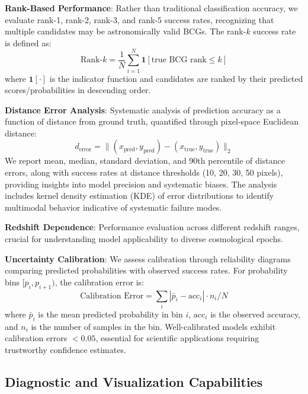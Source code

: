 \documentclass[twocolumn,10pt]{aastex631}
\begin{document}
\textbf{Rank-Based Performance}: Rather than traditional classification accuracy, we evaluate rank-1, rank-2, rank-3, and rank-5 success rates, recognizing that multiple candidates may be astronomically valid BCGs. The rank-$k$ success rate is defined as:
\begin{equation}
\text{Rank-}k = \frac{1}{N} \sum_{i=1}^{N} \mathbf{1}[\text{true BCG rank} \leq k]
\end{equation}
where $\mathbf{1}[\cdot]$ is the indicator function and candidates are ranked by their predicted scores/probabilities in descending order.

\textbf{Distance Error Analysis}: Systematic analysis of prediction accuracy as a function of distance from ground truth, quantified through pixel-space Euclidean distance:
\begin{equation}
d_{\text{error}} = \|(x_{\text{pred}}, y_{\text{pred}}) - (x_{\text{true}}, y_{\text{true}})\|_2
\end{equation}
We report mean, median, standard deviation, and 90th percentile of distance errors, along with success rates at distance thresholds (10, 20, 30, 50 pixels), providing insights into model precision and systematic biases. The analysis includes kernel density estimation (KDE) of error distributions to identify multimodal behavior indicative of systematic failure modes.

\textbf{Redshift Dependence}: Performance evaluation across different redshift ranges, crucial for understanding model applicability to diverse cosmological epochs.

\textbf{Uncertainty Calibration}: We assess calibration through reliability diagrams comparing predicted probabilities with observed success rates. For probability bins $[p_i, p_{i+1})$, the calibration error is:
\begin{equation}
\text{Calibration Error} = \sum_{i} |\bar{p}_i - \text{acc}_i| \cdot n_i / N
\end{equation}
where $\bar{p}_i$ is the mean predicted probability in bin $i$, $\text{acc}_i$ is the observed accuracy, and $n_i$ is the number of samples in the bin. Well-calibrated models exhibit calibration errors $< 0.05$, essential for scientific applications requiring trustworthy confidence estimates.

\subsection{Diagnostic and Visualization Capabilities}
\end{document}
